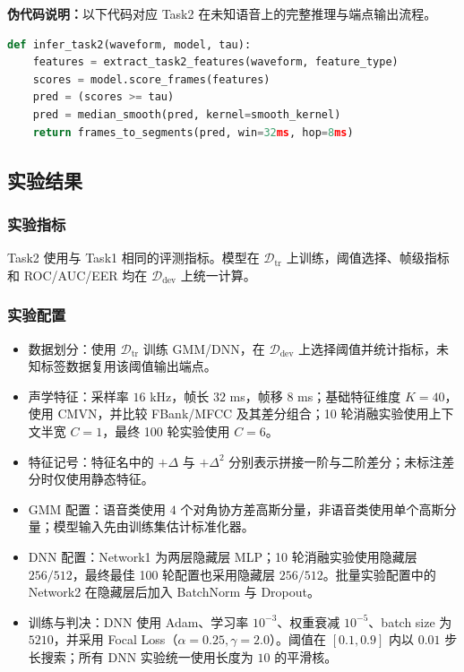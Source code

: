 \documentclass[a4paper]{article}
\begin{document}
\textbf{伪代码说明：}以下代码对应 Task2 在未知语音上的完整推理与端点输出流程。

\begin{lstlisting}[language=python]
def infer_task2(waveform, model, tau):
    features = extract_task2_features(waveform, feature_type)
    scores = model.score_frames(features)
    pred = (scores >= tau)
    pred = median_smooth(pred, kernel=smooth_kernel)
    return frames_to_segments(pred, win=32ms, hop=8ms)
\end{lstlisting}

\subsection{实验结果}

\subsubsection{实验指标}
Task2 使用与 Task1 相同的评测指标。模型在 $\mathcal{D}_{\text{tr}}$ 上训练，阈值选择、帧级指标和 ROC/AUC/EER 均在 $\mathcal{D}_{\text{dev}}$ 上统一计算。

\subsubsection{实验配置}
\label{sec:task2-config}

\begin{itemize}
  \item 数据划分：使用 $\mathcal{D}_{\text{tr}}$ 训练 GMM/DNN，在 $\mathcal{D}_{\text{dev}}$ 上选择阈值并统计指标，未知标签数据复用该阈值输出端点。
  \item 声学特征：采样率 $16$ kHz，帧长 $32$ ms，帧移 $8$ ms；基础特征维度 $K=40$，使用 CMVN，并比较 FBank/MFCC 及其差分组合；10 轮消融实验使用上下文半宽 $C=1$，最终 100 轮实验使用 $C=6$。
  \item 特征记号：特征名中的 $+\Delta$ 与 $+\Delta^2$ 分别表示拼接一阶与二阶差分；未标注差分时仅使用静态特征。
  \item GMM 配置：语音类使用 $4$ 个对角协方差高斯分量，非语音类使用单个高斯分量；模型输入先由训练集估计标准化器。
  \item DNN 配置：Network1 为两层隐藏层 MLP；10 轮消融实验使用隐藏层 $256/512$，最终最佳 100 轮配置也采用隐藏层 $256/512$。批量实验配置中的 Network2 在隐藏层后加入 BatchNorm 与 Dropout。
  \item 训练与判决：DNN 使用 Adam、学习率 $10^{-3}$、权重衰减 $10^{-5}$、batch size 为 $5210$，并采用 Focal Loss（$\alpha=0.25,\gamma=2.0$）。阈值在 $[0.1,0.9]$ 内以 $0.01$ 步长搜索；所有 DNN 实验统一使用长度为 $10$ 的平滑核。
\end{itemize}
\end{document}
